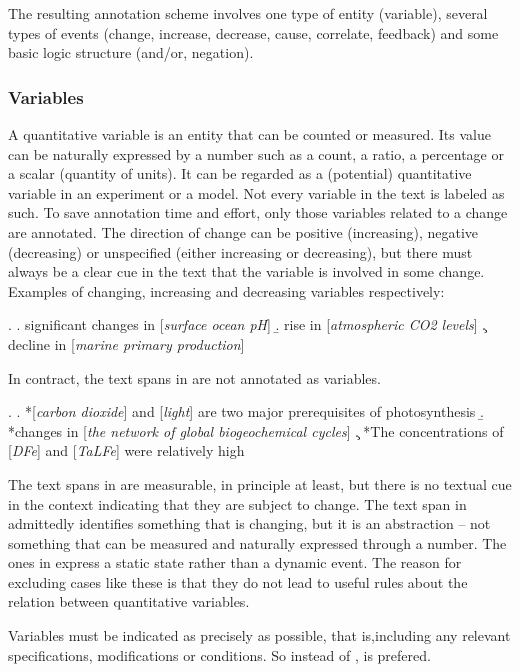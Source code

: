 \documentclass[10pt, a4paper]{article}
\begin{document}
The resulting annotation scheme involves one type of entity (variable), several types of events (change, increase, decrease, cause, correlate, feedback) and some basic logic structure (and/or, negation).  


\subsubsection{Variables}

A quantitative variable is an entity that can be counted or measured.
Its value can be naturally expressed by a number such as a count, a ratio, a percentage or a scalar (quantity of units).
It can be regarded as a (potential) quantitative variable in an experiment or a model. 
Not every variable in the text is labeled as such.
To save annotation time and effort, only those variables related to a change are annotated.
The  direction of change can be positive (increasing), negative (decreasing) or unspecified (either increasing or decreasing), but there must always be a clear cue in the text that the variable is involved in some change. 
Examples of changing, increasing and decreasing variables respectively:

\ex.
  \a. significant changes in [\emph{surface ocean pH}]
  \b. rise in [\emph{atmospheric CO2 levels}]
  \c. decline in [\emph{marine primary production}]

In contract, the text spans in \Next are not annotated as variables.

\ex.
  \a. *[\emph{carbon dioxide}] and [\emph{light}] are two major prerequisites of photosynthesis
  \b. *changes in [\emph{the network of global biogeochemical cycles}] 
  \c. *The concentrations of [\emph{DFe}] and [\emph{TaLFe}] were relatively high

The text spans in \Last[a] are measurable, in principle at least, but there is no textual cue in the context indicating that they are subject to change. 
The text span in \Last[b] admittedly identifies something that is changing, but it is an abstraction -- not something that can be measured and naturally expressed through a number. 
The ones in \Last[c] express a static state rather than a dynamic event.
The reason for excluding cases like these is that they do not lead to useful rules about the relation between quantitative variables.

Variables must be indicated as precisely as possible, that is,including any relevant specifications, modifications or conditions. So instead of \Next[a], \Next[b] is prefered.
\end{document}
